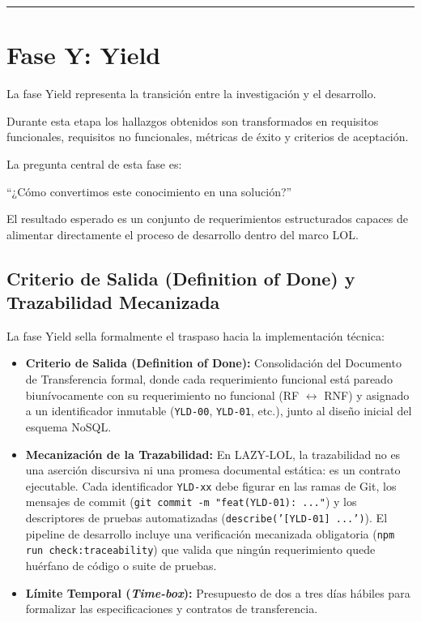 \documentclass[14pt,a4paper,oneside]{extbook}
\begin{document}
\par\vspace{1.5em}\noindent\hfill\rule{0.25\textwidth}{0.6pt}\hfill\par\vspace{1.5em}

\section{Fase Y: Yield}

La fase Yield representa la transición entre la investigación y el desarrollo.

Durante esta etapa los hallazgos obtenidos son transformados en requisitos funcionales, requisitos no funcionales, métricas de éxito y criterios de aceptación.

La pregunta central de esta fase es:

\begin{keyquestion}
\enquote{¿Cómo convertimos este conocimiento en una solución?}
\end{keyquestion}

El resultado esperado es un conjunto de requerimientos estructurados capaces de alimentar directamente el proceso de desarrollo dentro del marco LOL.

\subsection{Criterio de Salida (Definition of Done) y Trazabilidad Mecanizada}

La fase Yield sella formalmente el traspaso hacia la implementación técnica:

\begin{itemize}
\item \textbf{Criterio de Salida (Definition of Done):} Consolidación del Documento de Transferencia formal, donde cada requerimiento funcional está pareado biunívocamente con su requerimiento no funcional (RF $\leftrightarrow$ RNF) y asignado a un identificador inmutable (\texttt{YLD-00}, \texttt{YLD-01}, etc.), junto al diseño inicial del esquema NoSQL.
\item \textbf{Mecanización de la Trazabilidad:} En LAZY-LOL, la trazabilidad no es una aserción discursiva ni una promesa documental estática: es un contrato ejecutable. Cada identificador \texttt{YLD-xx} debe figurar en las ramas de Git, los mensajes de commit (\texttt{git commit -m "feat(YLD-01): ..."}) y los descriptores de pruebas automatizadas (\texttt{describe('[YLD-01] ...')}). El pipeline de desarrollo incluye una verificación mecanizada obligatoria (\texttt{npm run check:traceability}) que valida que ningún requerimiento quede huérfano de código o suite de pruebas.
\item \textbf{Límite Temporal (\textit{Time-box}):} Presupuesto de dos a tres días hábiles para formalizar las especificaciones y contratos de transferencia.
\end{itemize}
\end{document}
